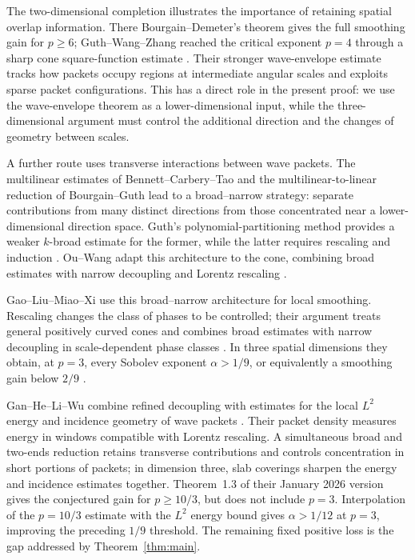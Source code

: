 The two-dimensional completion illustrates the importance of retaining
spatial overlap information. There Bourgain--Demeter's theorem gives
the full smoothing gain for $p\ge6$; Guth--Wang--Zhang reached the
critical exponent $p=4$ through a sharp cone square-function estimate
\cite{GuthWangZhang2020}. Their stronger wave-envelope estimate tracks
how packets occupy regions at intermediate angular scales and exploits
sparse packet configurations. This has a direct role in the present
proof: we use the wave-envelope theorem as a lower-dimensional input,
while the three-dimensional argument must control the additional
direction and the changes of geometry between scales.

A further route uses transverse interactions between wave packets.
The multilinear estimates of Bennett--Carbery--Tao and the
multilinear-to-linear reduction of Bourgain--Guth
\cite{BennettCarberyTao2006,BourgainGuth2011} lead to a broad--narrow
strategy: separate contributions from many distinct directions from
those concentrated near a lower-dimensional direction space.
Guth's polynomial-partitioning method provides a weaker $k$-broad
estimate for the former, while the latter requires rescaling and
induction \cite{Guth2018}. Ou--Wang adapt this architecture to the
cone, combining broad estimates with narrow decoupling and Lorentz
rescaling \cite{OuWang2022}.

Gao--Liu--Miao--Xi use this broad--narrow architecture for local
smoothing. Rescaling changes the class of phases to be controlled;
their argument treats general positively curved cones and combines
broad estimates with narrow decoupling in scale-dependent phase
classes \cite{GaoLiuMiaoXi2023}. In three spatial dimensions they
obtain, at $p=3$, every Sobolev exponent $\alpha>1/9$, or equivalently
a smoothing gain below $2/9$
\cite[Corollary~1.3]{GaoLiuMiaoXi2023}.

Gan--He--Li--Wu combine refined decoupling with estimates for the local
$L^2$ energy and incidence geometry of wave packets
\cite{GanHeLiWu2026}. Their packet density measures energy in windows
compatible with Lorentz rescaling. A simultaneous broad and two-ends
reduction retains transverse contributions and controls concentration
in short portions of packets; in dimension three, slab coverings
sharpen the energy and incidence estimates together.
Theorem~1.3 of their January 2026 version gives the conjectured gain
for $p\ge10/3$, but does not include $p=3$. Interpolation of the
$p=10/3$ estimate with the $L^2$ energy bound gives $\alpha>1/12$
at $p=3$, improving the preceding $1/9$ threshold. The remaining
fixed positive loss is the gap addressed by Theorem~\ref{thm:main}.

